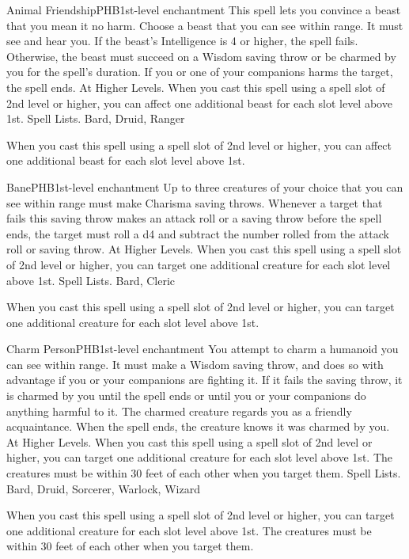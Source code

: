 \begin{spell}{Animal Friendship}{PHB}{1st-level enchantment}
{
}
This spell lets you convince a beast that you mean it no harm. Choose a beast that you can see within range. It must see and hear you. If the beast’s Intelligence is 4 or higher, the spell fails. Otherwise, the beast must succeed on a Wisdom saving throw or be charmed by you for the spell’s duration. If you or one of your companions harms the target, the spell ends.
At Higher Levels. When you cast this spell using a spell slot of 2nd level or higher, you can affect one additional beast for each slot level above 1st.
Spell Lists. Bard, Druid, Ranger

 When you cast this spell using a spell slot of 2nd level or higher, you can affect one additional beast for each slot level above 1st.
\end{spell}

\begin{spell}{Bane}{PHB}{1st-level enchantment}
{
}
Up to three creatures of your choice that you can see within range must make Charisma saving throws. Whenever a target that fails this saving throw makes an attack roll or a saving throw before the spell ends, the target must roll a d4 and subtract the number rolled from the attack roll or saving throw.
At Higher Levels. When you cast this spell using a spell slot of 2nd level or higher, you can target one additional creature for each slot level above 1st.
Spell Lists. Bard, Cleric

 When you cast this spell using a spell slot of 2nd level or higher, you can target one additional creature for each slot level above 1st.
\end{spell}

\begin{spell}{Charm Person}{PHB}{1st-level enchantment}
{
}
You attempt to charm a humanoid you can see within range. It must make a Wisdom saving throw, and does so with advantage if you or your companions are fighting it. If it fails the saving throw, it is charmed by you until the spell ends or until you or your companions do anything harmful to it. The charmed creature regards you as a friendly acquaintance. When the spell ends, the creature knows it was charmed by you.
At Higher Levels. When you cast this spell using a spell slot of 2nd level or higher, you can target one additional creature for each slot level above 1st. The creatures must be within 30 feet of each other when you target them.
Spell Lists. Bard, Druid, Sorcerer, Warlock, Wizard

 When you cast this spell using a spell slot of 2nd level or higher, you can target one additional creature for each slot level above 1st. The creatures must be within 30 feet of each other when you target them.
\end{spell}

